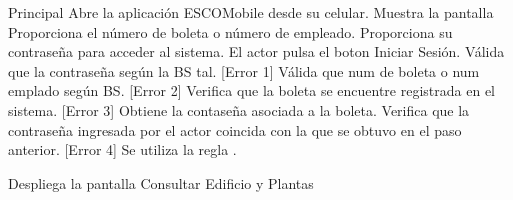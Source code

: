 	\begin{UCtrayectoria}{Principal}
	\UCpaso [\UCactor] Abre la aplicación ESCOMobile desde su celular.
	\UCpaso Muestra la pantalla 
	\UCpaso[\UCactor] Proporciona el número de boleta o número de empleado.
	\UCpaso[\UCactor] Proporciona su contraseña para acceder al sistema.
	\UCpaso[\UCactor] El actor pulsa el boton Iniciar Sesión.
	\UCpaso Válida que la contraseña según la BS tal. [Error 1]
	\UCpaso Válida que num de boleta o num emplado según BS. [Error 2]
	\UCpaso Verifica que la boleta se encuentre registrada en el sistema. [Error 3]
	\UCpaso Obtiene la contaseña asociada a la boleta. 
	\UCpaso Verifica que la contraseña ingresada por el actor coincida con la 
	que se obtuvo en el paso anterior. [Error 4] 
	\UCpaso 
	Se utiliza la regla  .
      	
		
	\UCpaso Despliega la pantalla Consultar Edificio y Plantas
	
	
\end{UCtrayectoria}


		
